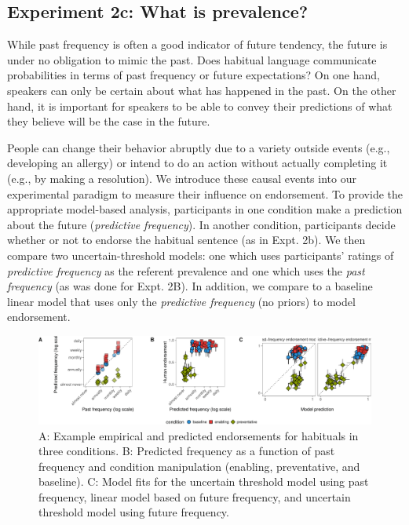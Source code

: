 \documentclass[english,,man,floatsintext]{apa6}
\theoremstyle{definition}
\theoremstyle{definition}
\theoremstyle{definition}
\theoremstyle{remark}
\begin{document}
\hypertarget{experiment-2c-what-is-prevalence}{%
\subsection{Experiment 2c: What is
prevalence?}\label{experiment-2c-what-is-prevalence}}

While past frequency is often a good indicator of future tendency, the
future is under no obligation to mimic the past. Does habitual language
communicate probabilities in terms of past frequency or future
expectations? On one hand, speakers can only be certain about what has
happened in the past. On the other hand, it is important for speakers to
be able to convey their predictions of what they believe will be the
case in the future.

People can change their behavior abruptly due to a variety outside
events (e.g., developing an allergy) or intend to do an action without
actually completing it (e.g., by making a resolution). We introduce
these causal events into our experimental paradigm to measure their
influence on endorsement. To provide the appropriate model-based
analysis, participants in one condition make a prediction about the
future (\emph{predictive frequency}). In another condition, participants
decide whether or not to endorse the habitual sentence (as in Expt. 2b).
We then compare two uncertain-threshold models: one which uses
participants' ratings of \emph{predictive frequency} as the referent
prevalence and one which uses the \emph{past frequency} (as was done for
Expt. 2B). In addition, we compare to a baseline linear model that uses
only the \emph{predictive frequency} (no priors) to model endorsement.

\begin{figure}[!h]
\includegraphics[width=\textwidth]{figs/habituals-predictive-figure-1} \caption{A: Example empirical and predicted endorsements for habituals in three conditions. B: Predicted frequency as a function of past frequency and condition manipulation (enabling, preventative, and baseline). C: Model fits for the uncertain threshold model using past frequency, linear model based on future frequency, and uncertain threshold model using future frequency.}\label{fig:habituals-predictive-figure}
\end{figure}
\end{document}
